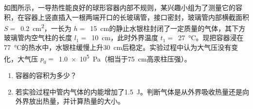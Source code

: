 如图所示，一导热性能良好的球形容器内部不规则，某兴趣小组为了测量它的容积，在容器上竖直插入一根两端开口的长玻璃管，接口密封，玻璃管内部横截面积 \( S = \) \,\qty{0.2}{cm^2}，一长为 \( h = \) \,\qty{15}{cm}的静止水银柱封闭了一定质量的气体，其下方玻璃管内空气柱的长度 \( l_1 = \) \,\qty{10}{cm}，此时外界温度 \( t_1 = \) \,\qty{27}{\degreeCelsius}。现把容器浸在\qty{77}{\degreeCelsius}的热水中，水银柱缓慢上升\qty{30}{cm}后稳定。实验过程中认为大气压没有变化，大气压 \( p_0 = \) \,\qty{1.0e5}{Pa}（相当于\qty{75}{cm}高汞柱压强）。
\begin{enumerate}
    \item 容器的容积为多少？
    \item 若实验过程中管内气体的内能增加了\qty{1.5}{J}。判断气体是从外界吸收热量还是向外界放出热量，并计算热量的大小。
\end{enumerate}

